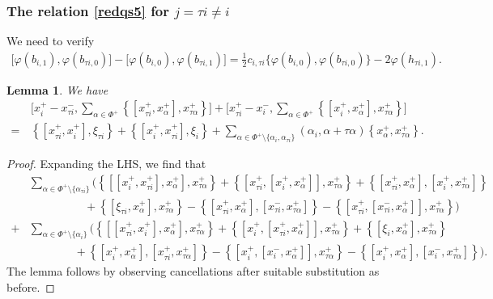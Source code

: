 \documentclass[11pt,reqno]{amsart}
\numberwithin{equation}{section}
\newtheorem{lem}[thm]{Lemma}
\theoremstyle{definition}
\theoremstyle{remark}
\newcommand{\hf}{\tfrac12}
\begin{document}
\subsubsection{The relation \eqref{redqs5} for $j=\tau i\ne i$} 
We need to verify
\begin{align}
\big[\varphi(b_{i,1}),\varphi(b_{\tau i,0})\big]-\big[\varphi(b_{i,0}),\varphi(b_{\tau i,1})\big]= \hf c_{i,\tau i}\big\{\varphi(b_{i,0}),\varphi(b_{\tau i,0})\big\}-2 \varphi(h_{\tau i,1 }).\label{bbtaui=jnei}
\end{align}
\begin{lem}\label{lem:helper4}
We have
\begin{align*}
&\Big[
x_i^+-x_{\tau i}^{-},
\sum_{\alpha\in\Phi^+}
\left\{[x_{\tau i}^{+},x_\alpha^{+}],
x_{\tau\alpha}^{+}\right\}
\Big]
+
\Big[
x_{\tau i}^{+}-x_i^{-},
\sum_{\alpha\in\Phi^+}
\left\{[x_i^{+},x_\alpha^{+}],
x_{\tau\alpha}^{+}\right\}
\Big] \\
=\,&
\left\{ [x_{\tau i}^+,x_i^+ ],\xi_{\tau i}\right\}
+
\left\{ [x_i^+,x_{\tau i}^+ ],\xi_i\right\}+
\sum_{\alpha\in\Phi^+\setminus\{\alpha_{ i},\alpha_{\tau i}\}}
(\alpha_i,\alpha+\tau\alpha )
\left\{x_\alpha^+,x_{\tau\alpha}^+\right\}  . 
\end{align*} 
\end{lem}
\begin{proof}
Expanding the LHS, we find that	
\begin{align*}
&\sum_{\alpha\in\Phi^+\setminus\{\alpha_{\tau i}\}}
\Big(
\left\{\left[[x_i^+,x_{\tau i}^+],x_\alpha^+\right],
x_{\tau\alpha}^+\right\}
+
\left\{\left[x_{\tau i}^+,[x_i^+,x_\alpha^+]\right],
x_{\tau\alpha}^+\right\}  +
\left\{[x_{\tau i}^+,x_\alpha^+],
[x_i^+,x_{\tau\alpha}^+]\right\}                     \\
&\qquad\qquad~~~~
+
\left\{ [\xi_{\tau i},x_\alpha^+ ],
x_{\tau\alpha}^+\right\}                       
-
\left\{ [x_{\tau i}^+,x_\alpha^+ ],
 [x_{\tau i}^{-},x_{\tau\alpha}^+ ]\right\}
-
\left\{\left[x_{\tau i}^+,
 [x_{\tau i}^{-},x_\alpha^+ ]\right],
x_{\tau\alpha}^+\right\}
\Big)                                          \\
+&
\sum_{\alpha\in\Phi^+\setminus\{\alpha_i\}}
\Big(
\left\{\left[[x_{\tau i}^+,x_i^+],x_\alpha^+\right],
x_{\tau\alpha}^+\right\}
+
\left\{\left[x_i^+,[x_{\tau i}^+,x_\alpha^+]\right],
x_{\tau\alpha}^+\right\}  +
\left\{ [\xi_i,x_\alpha^+ ],
x_{\tau\alpha}^+\right\}                     \\
&\qquad\qquad
+
\left\{ [x_i^+,x_\alpha^+ ],
 [x_{\tau i}^+,x_{\tau\alpha}^+ ]\right\}
-
\left\{\left[x_i^+, [x_i^-,x_\alpha^+ ]\right],
x_{\tau\alpha}^+\right\}
-
\left\{ [x_i^+,x_\alpha^+ ],
 [x_i^-,x_{\tau\alpha}^+ ]\right\}
\Big).                                          
  \end{align*}
 The lemma follows by observing cancellations after suitable substitution as before.
\end{proof}
\end{document}
